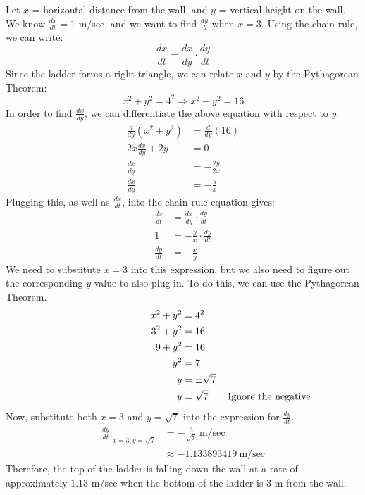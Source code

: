 \documentclass[12pt]{article}
\newcommand\at[2]{\left.#1\right|_{#2}}
\begin{document}
Let $ x $ = horizontal distance from the wall, and $ y $ = vertical height on the wall.
\medskip
\newline
We know $ \frac{dx}{dt} = 1 $ m/sec, and we want to find $ \frac{dy}{dt} $ when $ x = 3 $. Using the chain rule, we can write:
\[ \frac{dx}{dt} = \frac{dx}{dy} \cdot \frac{dy}{dt} \]
Since the ladder forms a right triangle, we can relate $ x $ and $ y $ by the Pythagorean Theorem:
\[ x^2 + y^2 = 4^2 \Longrightarrow x^2 + y^2 = 16 \]
In order to find $ \frac{dx}{dy} $, we can differentiate the above equation with respect to $ y $.
\begin{align*}
    \frac{d}{dy} \left( x^2 + y^2 \right) & = \frac{d}{dy} \left( 16 \right) \\
    2x \frac{dx}{dy} + 2y & = 0 \\
    \frac{dx}{dy} & = -\frac{2y}{2x} \\
    \frac{dx}{dy} & = -\frac{y}{x}
\end{align*}
Plugging this, as well as $ \frac{dx}{dt} $, into the chain rule equation gives:
\begin{align*}
    \frac{dx}{dt} & = \frac{dx}{dy} \cdot \frac{dy}{dt} \\
    1 & = -\frac{y}{x} \cdot \frac{dy}{dt} \\
    \frac{dy}{dt} & = -\frac{x}{y}
\end{align*}
We need to substitute $ x = 3 $ into this expression, but we also need to figure out the corresponding $ y $ value to also plug in. To do this, we can use the Pythagorean Theorem.
\begin{align*}
    x^2 + y^2 & = 4^2 \\
    3^2 + y^2 & = 16 \\
    9 + y^2 & = 16 \\
    y^2 & = 7 \\
    y & = \pm \sqrt{7} \\
    y & = \sqrt{7} \rlap{\qquad \text{Ignore the negative solution}}
\end{align*}
Now, substitute both $ x = 3 $ and $ y = \sqrt{7} $ into the expression for $ \frac{dy}{dt} $.
\begin{align*}
    \at{\frac{dy}{dt}}{x = 3, y = \sqrt{7}} & = -\frac{3}{\sqrt{7}} \ \text{m/sec} \\
    & \approx -1.133893419 \ \text{m/sec}
\end{align*}
Therefore, the top of the ladder is falling down the wall at a rate of approximately $ 1.13 $ m/sec when the bottom of the ladder is $ 3 $ m from the wall.
\end{document}
